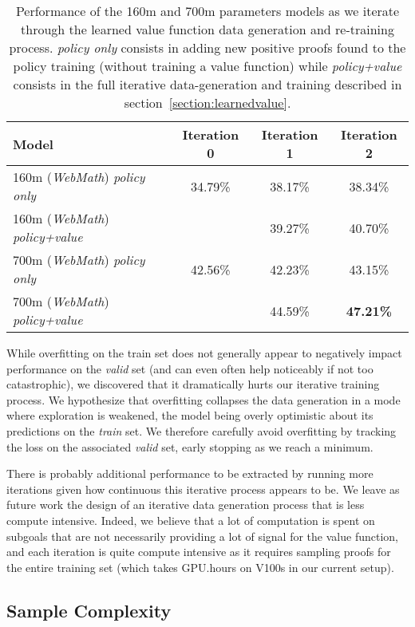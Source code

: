 \documentclass{article}
\begin{document}
\begin{table}[ht]
\caption{Performance of the 160m and 700m parameters models as we iterate through the learned value function data generation and re-training process. \textit{policy only} consists in adding new positive proofs found to the policy training (without training a value function) while \textit{policy+value} consists in the full iterative data-generation and training described in section~\ref{section:learnedvalue}.} 
\centering
\begin{tabular}{ |l|c|c|c| }
    \hline
    Model & Iteration 0 & Iteration 1 & Iteration 2 \\
    \hline
    160m (\textit{WebMath}) \textit{policy only} & 34.79\% & 38.17\% & 38.34\% \\
    160m (\textit{WebMath}) \textit{policy+value} & & 39.27\% & 40.70\% \\
    700m (\textit{WebMath}) \textit{policy only} & 42.56\% & 42.23\% & 43.15\% \\
    700m (\textit{WebMath}) \textit{policy+value} & & 44.59\% & \textbf{47.21\%} \\
    \hline
\end{tabular}
\label{table:value}
\end{table}


While overfitting on the train set does not generally appear to negatively impact performance on the \textit{valid} set (and can even often help noticeably if not too catastrophic), we discovered that it dramatically hurts our iterative training process. We hypothesize that overfitting collapses the data generation in a mode where exploration is weakened, the model being overly optimistic about its predictions on the \textit{train} set. We therefore carefully avoid overfitting by tracking the loss on the associated \textit{valid} set, early stopping as we reach a minimum.

There is probably additional performance to be extracted by running more iterations given how continuous this iterative process appears to be. We leave as future work the design of an iterative data generation process that is less compute intensive. Indeed, we believe that a lot of computation is spent on subgoals that are not necessarily providing a lot of signal for the value function, and each iteration is quite compute intensive as it requires sampling proofs for the entire training set (which takes  GPU.hours on V100s in our current setup).

\subsection{Sample Complexity}
\label{section:samplecomplexity}
\end{document}

